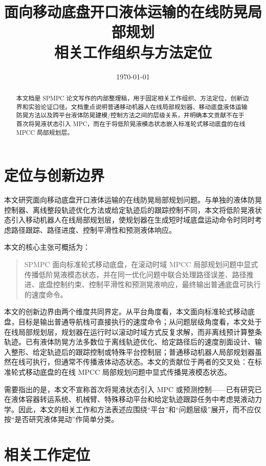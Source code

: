 \documentclass[12pt,a4paper]{ctexart}
\title{面向移动底盘开口液体运输的在线防晃局部规划\\相关工作组织与方法定位}
\author{}
\date{\today}
\newcommand{\SPMPC}{SPMPC}
\newcommand{\MPCC}{MPCC}
\newcommand{\MPC}{MPC}
\begin{document}
\maketitle

\begin{abstract}
本文档是 \SPMPC{} 论文写作的内部整理稿，用于固定相关工作组织、方法定位、创新边界和实验论证口径。文档重点说明普通移动机器人在线局部规划器、移动底盘液体运输防晃方法以及跨平台液体防晃建模/控制方法之间的层级关系，并明确本文贡献不在于首次将晃液状态引入 \MPC{}，而在于将低阶晃液模态状态嵌入标准轮式移动底盘的在线 \MPCC{} 局部规划层。
\end{abstract}

\tableofcontents
\newpage

\section{定位与创新边界}
\label{sec:positioning}

本文研究面向移动底盘开口液体运输的在线防晃局部规划问题。与单独的液体防晃控制器、离线整段轨迹优化方法或给定轨迹后的跟踪控制不同，本文将低阶晃液状态引入移动机器人在线局部规划层，使规划器在生成短时域底盘运动命令时同时考虑路径跟踪、路径进度、控制平滑性和预测液体响应。

本文的核心主张可概括为：
\begin{quote}
\SPMPC{} 面向标准轮式移动底盘，在滚动时域 \MPCC{} 局部规划问题中显式传播低阶晃液模态状态，并在同一优化问题中联合处理路径误差、路径推进、底盘控制约束、控制平滑性和预测晃液响应，最终输出普通底盘可执行的速度命令。
\end{quote}

本文的创新边界由两个维度共同界定。从平台角度看，本文面向标准轮式移动底盘，目标是输出普通导航栈可直接执行的速度命令；从问题层级角度看，本文处于在线局部规划层，规划器在运行时以滚动时域方式反复求解，而非离线预计算整条轨迹。已有液体防晃方法多数位于离线轨迹优化、给定路径后的速度剖面设计、输入整形、给定轨迹后的跟踪控制或特殊平台控制层；普通移动机器人局部规划器虽然在线可执行，但通常不传播液体动态状态。本文的贡献位于两者的交叉处：在标准轮式移动底盘的在线 \MPCC{} 局部规划问题中显式传播晃液模态状态。

需要指出的是，本文不宣称首次将晃液状态引入 \MPC{} 或预测控制——已有研究已在液体容器转运系统、机械臂、特殊移动平台和给定轨迹跟踪任务中考虑晃液动力学。因此，本文的相关工作和方法表述应围绕“平台”和“问题层级”展开，而不应仅按“是否研究液体晃动”作简单分类。

\section{相关工作定位}
\label{sec:related-work-organization}
\end{document}
